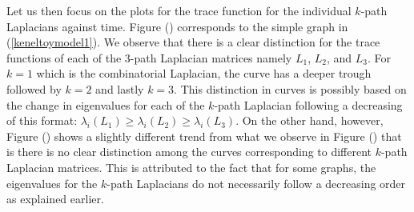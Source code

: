 \documentclass[10pt,a4paper]{article}
\begin{document}
	  Let us then focus on the plots for the trace function for the individual $k$-path Laplacians against time. Figure () corresponds to the simple graph in (\ref{keneltoymodel1}). We observe that there is a clear distinction for the trace functions of each of the $3$-path Laplacian matrices namely $L_1$, $L_2$, and $L_3$. For $k=1$ which is the combinatorial Laplacian, the curve has a deeper trough followed by $k=2$ and lastly $k=3$. This distinction in curves is possibly based on the change in eigenvalues for each of the $k$-path Laplacian following a decreasing of this format: $\lambda_i(L_1) \geq \lambda_i(L_2) \geq \lambda_i(L_3)$. On the other hand, however, Figure () shows a slightly different trend from what we observe in Figure () that is there is no clear distinction among the curves corresponding to different $k$-path Laplacian matrices. This is attributed to the fact that for some graphs, the eigenvalues for the $k$-path Laplacians do not necessarily follow a decreasing order as explained earlier.
	  
\end{document}
